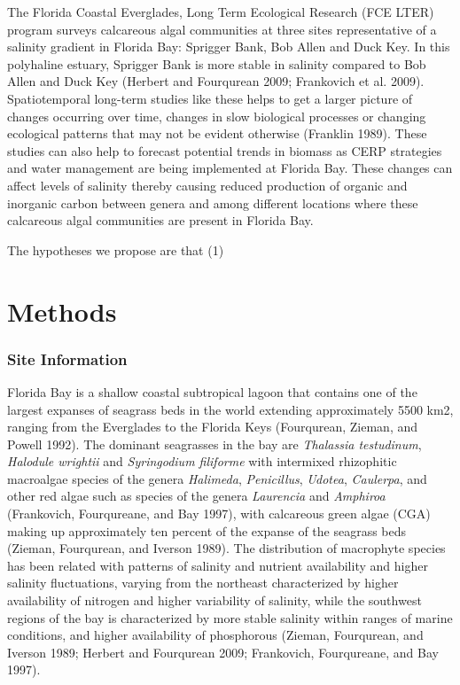 \documentclass[]{article}
\begin{document}
The Florida Coastal Everglades, Long Term Ecological Research (FCE LTER)
program surveys calcareous algal communities at three sites
representative of a salinity gradient in Florida Bay: Sprigger Bank, Bob
Allen and Duck Key. In this polyhaline estuary, Sprigger Bank is more
stable in salinity compared to Bob Allen and Duck Key (Herbert and
Fourqurean 2009; Frankovich et al. 2009). Spatiotemporal long-term
studies like these helps to get a larger picture of changes occurring
over time, changes in slow biological processes or changing ecological
patterns that may not be evident otherwise (Franklin 1989). These
studies can also help to forecast potential trends in biomass as CERP
strategies and water management are being implemented at Florida Bay.
These changes can affect levels of salinity thereby causing reduced
production of organic and inorganic carbon between genera and among
different locations where these calcareous algal communities are present
in Florida Bay.

The hypotheses we propose are that (1)

\hypertarget{methods}{%
\section{Methods}\label{methods}}

\hypertarget{site-information}{%
\subsubsection{Site Information}\label{site-information}}

Florida Bay is a shallow coastal subtropical lagoon that contains one of
the largest expanses of seagrass beds in the world extending
approximately 5500 km2, ranging from the Everglades to the Florida Keys
(Fourqurean, Zieman, and Powell 1992). The dominant seagrasses in the
bay are \emph{Thalassia testudinum}, \emph{Halodule wrightii} and
\emph{Syringodium filiforme} with intermixed rhizophitic macroalgae
species of the genera \emph{Halimeda}, \emph{Penicillus}, \emph{Udotea},
\emph{Caulerpa}, and other red algae such as species of the genera
\emph{Laurencia} and \emph{Amphiroa} (Frankovich, Fourqureane, and Bay
1997), with calcareous green algae (CGA) making up approximately ten
percent of the expanse of the seagrass beds (Zieman, Fourqurean, and
Iverson 1989). The distribution of macrophyte species has been related
with patterns of salinity and nutrient availability and higher salinity
fluctuations, varying from the northeast characterized by higher
availability of nitrogen and higher variability of salinity, while the
southwest regions of the bay is characterized by more stable salinity
within ranges of marine conditions, and higher availability of
phosphorous (Zieman, Fourqurean, and Iverson 1989; Herbert and
Fourqurean 2009; Frankovich, Fourqureane, and Bay 1997).
\end{document}
